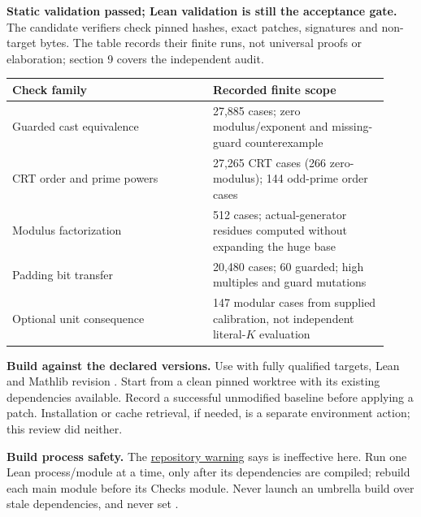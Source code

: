 \textbf{Static validation passed; Lean validation is still the acceptance gate.}
The candidate verifiers check pinned hashes, exact patches, signatures and non-target bytes. The table records their finite runs, not universal proofs or elaboration; section 9 covers the independent audit.

\begin{tabular}{@{}L{0.49\linewidth}L{0.43\linewidth}@{}}\toprule
Check family & Recorded finite scope\\\midrule
Guarded cast equivalence & 27,885 cases; zero modulus/exponent and missing-guard counterexample\\[5pt]
CRT order and prime powers & 27,265 CRT cases (266 zero-modulus); 144 odd-prime order cases\\[5pt]
Modulus factorization & 512 cases; actual-generator residues computed without expanding the huge base\\[5pt]
Padding bit transfer & 20,480 cases; 60 guarded; high multiples and guard mutations\\[5pt]
Optional unit consequence & 147 modular cases from supplied calibration, not independent literal-$K$ evaluation\\\bottomrule
\end{tabular}

\textbf{Build against the declared versions.} Use  with fully qualified targets, Lean  and Mathlib revision . Start from a clean pinned worktree with its existing dependencies available. Record a successful unmodified baseline before applying a patch. Installation or cache retrieval, if needed, is a separate environment action; this review did neither.

\textbf{Build process safety.} The \href{https://github.com/VladimirReshetnikov/ProveIt/blob/9f35798db4a63c25e435fca14d75931144657d7e/README.md\#L248-L271}{repository warning} says  is ineffective here. Run one Lean process/module at a time, only after its dependencies are compiled; rebuild each main module before its Checks module. Never launch an umbrella build over stale dependencies, and never set .

